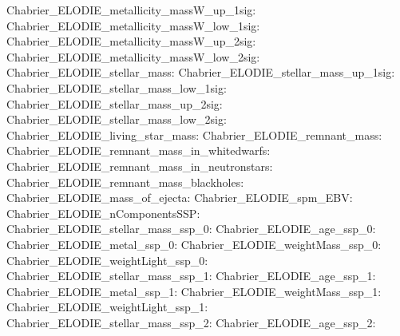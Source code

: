 Chabrier\_ELODIE\_metallicity\_massW\_up\_1sig:  \newline 
Chabrier\_ELODIE\_metallicity\_massW\_low\_1sig:  \newline 
Chabrier\_ELODIE\_metallicity\_massW\_up\_2sig:  \newline 
Chabrier\_ELODIE\_metallicity\_massW\_low\_2sig:  \newline 
Chabrier\_ELODIE\_stellar\_mass:  \newline 
Chabrier\_ELODIE\_stellar\_mass\_up\_1sig:  \newline 
Chabrier\_ELODIE\_stellar\_mass\_low\_1sig:  \newline 
Chabrier\_ELODIE\_stellar\_mass\_up\_2sig:  \newline 
Chabrier\_ELODIE\_stellar\_mass\_low\_2sig:  \newline 
Chabrier\_ELODIE\_living\_star\_mass:  \newline 
Chabrier\_ELODIE\_remnant\_mass:  \newline 
Chabrier\_ELODIE\_remnant\_mass\_in\_whitedwarfs:  \newline 
Chabrier\_ELODIE\_remnant\_mass\_in\_neutronstars:  \newline 
Chabrier\_ELODIE\_remnant\_mass\_blackholes:  \newline 
Chabrier\_ELODIE\_mass\_of\_ejecta:  \newline 
Chabrier\_ELODIE\_spm\_EBV:  \newline 
Chabrier\_ELODIE\_nComponentsSSP:  \newline 
Chabrier\_ELODIE\_stellar\_mass\_ssp\_0:  \newline 
Chabrier\_ELODIE\_age\_ssp\_0:  \newline 
Chabrier\_ELODIE\_metal\_ssp\_0:  \newline 
Chabrier\_ELODIE\_weightMass\_ssp\_0:  \newline 
Chabrier\_ELODIE\_weightLight\_ssp\_0:  \newline 
Chabrier\_ELODIE\_stellar\_mass\_ssp\_1:  \newline 
Chabrier\_ELODIE\_age\_ssp\_1:  \newline 
Chabrier\_ELODIE\_metal\_ssp\_1:  \newline 
Chabrier\_ELODIE\_weightMass\_ssp\_1:  \newline 
Chabrier\_ELODIE\_weightLight\_ssp\_1:  \newline 
Chabrier\_ELODIE\_stellar\_mass\_ssp\_2:  \newline 
Chabrier\_ELODIE\_age\_ssp\_2:  \newline 
